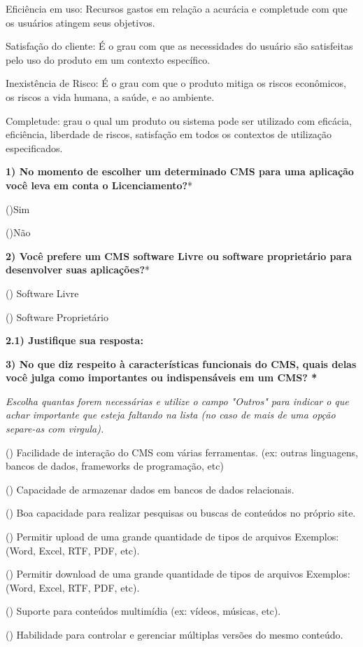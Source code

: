 \begin{apendicesenv}
Eficiência em uso: Recursos gastos em relação a acurácia e completude com que os usuários atingem seus objetivos.

Satisfação do cliente: É o grau com que as necessidades do usuário são satisfeitas pelo uso do produto em um contexto específico.

Inexistência de Risco: É o grau com que o produto mitiga os riscos econômicos, os riscos a vida humana, a saúde, e ao ambiente.

Completude: grau o qual um produto ou sistema pode ser utilizado com eficácia, eficiência,  liberdade de riscos, satisfação em todos os contextos de utilização especificados.

\textbf{1) No momento de escolher um determinado CMS para uma aplicação você leva em conta o Licenciamento?}*

()Sim
                             
()Não

\textbf{2) Você prefere um CMS software Livre ou software proprietário para desenvolver suas aplicações?}* 

() Software Livre

() Software Proprietário

\textbf{2.1) Justifique sua resposta:}

\textbf{3) No que diz respeito à características funcionais do CMS, quais delas você julga como importantes ou indispensáveis em um CMS? *}

\textit{Escolha quantas forem necessárias e utilize o campo "Outros" para indicar o que achar importante que esteja faltando na lista (no caso de mais de uma opção separe-as com virgula).}

() Facilidade de interação do CMS com várias ferramentas. (ex: outras linguagens, bancos de dados, frameworks de programação, etc)
  
() Capacidade de armazenar dados em bancos de dados relacionais.
 
() Boa capacidade para realizar pesquisas ou buscas de conteúdos no próprio site.
 
() Permitir upload de uma grande quantidade de tipos de arquivos Exemplos: (Word, Excel, RTF, PDF, etc).
 
() Permitir download de uma grande quantidade de tipos de arquivos Exemplos: (Word, Excel, RTF, PDF, etc).
 
() Suporte para conteúdos multimídia (ex: vídeos, músicas, etc).
 
() Habilidade para controlar e gerenciar múltiplas versões do mesmo conteúdo.
 

\end{apendicesenv}
